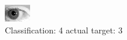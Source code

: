 \begin{figure}[h!]
\begin{center}
\includegraphics[width=0.60\columnwidth]{figures/ID200_class_4_target_3.png}
\end{center}
\caption{ Classification: 4 actual target: 3}
\label{fig:ID200_class_4_target_3}
\end{figure}
